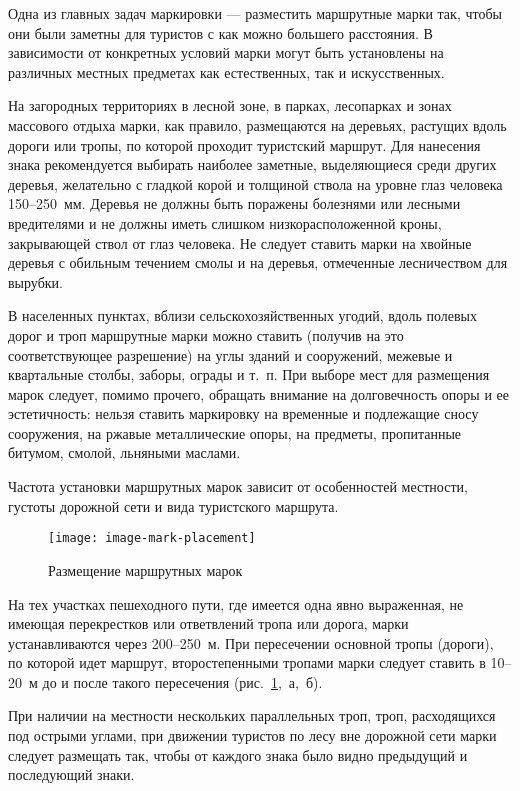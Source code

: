 \documentclass[a4paper,12pt,titlepage]{extarticle}
\begin{document}
Одна из главных задач маркировки --- разместить маршрутные марки так, чтобы они были заметны для туристов с как можно
большего расстояния. В зависимости от конкретных условий марки могут быть установлены на различных местных предметах как
естественных, так и искусственных.

На загородных территориях в лесной зоне, в парках,
лесопарках и зонах массового отдыха марки, как правило, размещаются на деревьях, растущих вдоль дороги или тропы, по
которой проходит туристский маршрут. Для нанесения знака рекомендуется выбирать наиболее заметные, выделяющиеся среди
других деревья, желательно с гладкой корой и толщиной ствола на уровне глаз человека 150--250~мм. Деревья не должны быть
поражены болезнями или лесными вредителями и не должны иметь слишком низкорасположенной кроны, закрывающей ствол от глаз
человека. Не следует ставить марки на хвойные деревья с обильным течением смолы и на деревья, отмеченные лесничеством
для вырубки.

В населенных пунктах, вблизи сельскохозяйственных угодий, вдоль полевых дорог и троп маршрутные марки можно ставить
(получив на это соответствующее разрешение) на углы зданий и сооружений, межевые и квартальные столбы, заборы, ограды и
т.~п. При выборе мест для размещения марок следует, помимо прочего, обращать внимание на долговечность опоры и ее
эстетичность: нельзя ставить маркировку на временные и подлежащие сносу сооружения, на ржавые металлические опоры, на
предметы, пропитанные битумом, смолой, льняными маслами.

Частота установки маршрутных марок зависит от особенностей местности, густоты дорожной сети и вида туристского маршрута.

\begin{figure}
	\centering
	\texttt{[image: image-mark-placement]}
	\caption{Размещение маршрутных марок}\label{fig:mark-placement}
\end{figure}

На тех участках пешеходного пути, где имеется одна явно выраженная, не имеющая перекрестков или ответвлений тропа или
дорога, марки устанавливаются через 200--250~м. При пересечении основной тропы (дороги), по которой идет маршрут,
второстепенными тропами марки следует ставить в 10--20~м до и после такого пересечения (рис.~\ref{fig:mark-placement},~а,~б).

При наличии на местности нескольких параллельных троп, троп, расходящихся под острыми углами, при движении туристов по
лесу вне дорожной сети марки следует размещать так, чтобы от каждого знака было видно предыдущий и последующий знаки.
\end{document}
